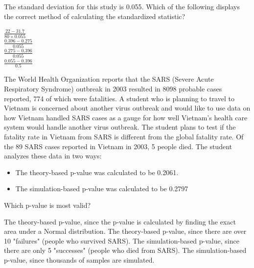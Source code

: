 \documentclass{article}
\begin{document}
\begin{mcquestions}
		\question[follow] The standard deviation for this study is 0.055. Which of the following displays the correct method of calculating the standardized statistic?
		
		\begin{mcanswerslist}
			\answer \(\frac{22-31.7}{80\times0.055}\)\\[0.1cm]
			\answer \(\frac{0.396-0.275}{0.055}\)\\[0.1cm]
			\answer[correct] \(\frac{0.275-0.396}{0.055}\)\\[0.1cm]
			\answer \(\frac{0.055-0.396}{0.5}\)\\[0.1cm]
		\end{mcanswerslist}
		
		\question The World Health Organization reports that the SARS (Severe Acute Respiratory Syndrome) outbreak in 2003 resulted in 8098 probable cases reported, 774 of which were fatalities. A student who is planning to travel to Vietnam is concerned about another virus outbreak and would like to use data on how Vietnam handled SARS cases as a gauge for how well Vietnam's health care system would handle another virus outbreak. The student plans to test if the fatality rate in Vietnam from SARS is different from the global fatality rate. Of the 89 SARS cases reported in Vietnam in 2003, 5 people died. The student analyzes these data in two ways:
		\begin{itemize}
			\item[Method 1:]  The theory-based p-value was calculated to be 0.2061.
			\item[Method 2:]  The simulation-based p-value was calculated to be 0.2797
		\end{itemize}
		Which p-value is most valid?
		
		\begin{mcanswerslist}
			\answer The theory-based p-value, since the p-value is calculated by finding the exact area under a Normal distribution.
			\answer The theory-based p-value, since there are over 10 "failures" (people who survived SARS).
			\answer[correct] The simulation-based p-value, since there are only 5 "successes" (people who died from SARS).
			\answer The simulation-based p-value, since thousands of samples are simulated.
		\end{mcanswerslist}
		
	\end{mcquestions}
\end{document}
